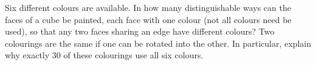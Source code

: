 Six different colours are available. In how many distinguishable ways can the faces of a cube be painted, each face with one colour (not all colours need be used), so that any two faces sharing an edge have different colours? Two colourings are the same if one can be rotated into the other. In particular, explain why exactly $30$ of these colourings use all six colours.
